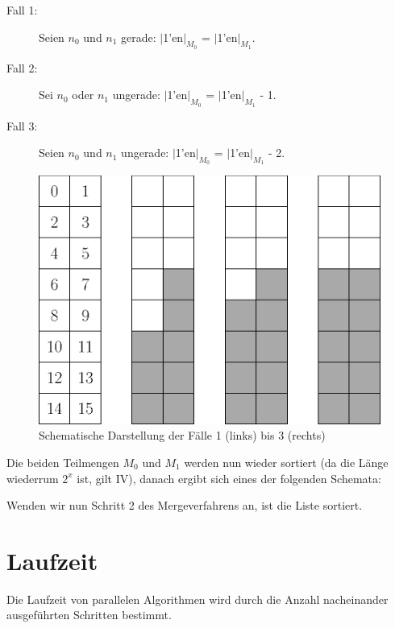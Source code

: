 \documentclass[11pt,ngerman]{article}
\begin{document}
\begin{description}
\begin{description}
\item[Fall 1:] Seien $n_0$ und $n_1$ gerade: $|$1'en$|_{M_0}$ = $|$1'en$|_{M_1}$.
\item[Fall 2:] Sei $n_0$ oder $n_1$ ungerade: $|$1'en$|_{M_0}$ = $|$1'en$|_{M_1}$ - 1.
\item[Fall 3:] Seien $n_0$ und $n_1$ ungerade: $|$1'en$|_{M_0}$ = $|$1'en$|_{M_1}$ - 2.
\end{description}
\begin{figure}
\begin{center}
\includegraphics[scale=0.4]{korrektheitOEM.eps}
\caption{Schematische Darstellung der Fälle 1 (links) bis 3 (rechts)}
\end{center}
\end{figure}
Die beiden Teilmengen $M_0$ und $M_1$ werden nun wieder sortiert (da die Länge wiederrum $2^x$ ist, gilt IV), danach ergibt sich eines der folgenden Schemata:
\end{description}
Wenden wir nun Schritt 2 des Mergeverfahrens an, ist die Liste sortiert.
\FloatBarrier
\section{Laufzeit}
Die Laufzeit von parallelen Algorithmen wird durch die Anzahl nacheinander ausgeführten Schritten bestimmt.
\end{document}
